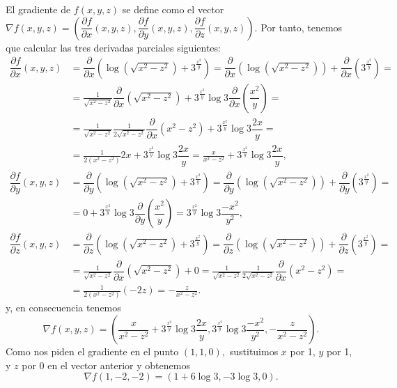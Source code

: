 {El gradiente de $f(x,y,z)$ se define como el vector $\nabla f(x,y,z)=(\dfrac{\partial f}{\partial x}(x,y,z),\dfrac{\partial f}{\partial y}(x,y,z),\dfrac{\partial f}{\partial z}(x,y,z))$. Por tanto, tenemos que calcular las tres derivadas parciales siguientes: 
\begin{align*}
\dfrac{\partial f}{\partial x}(x,y,z) &= \dfrac{\partial }{\partial x}(\log\left(\sqrt{x^{2}-z^{2}}\right) +3^{\tfrac{x^{2}}{y}}) = \dfrac{\partial }{\partial x}(\log \left(\sqrt{x^{2}-z^{2}}\right) )+\dfrac{\partial }{\partial x}(3^{\tfrac{x^{2}}{y}})= \\
&= \frac{1}{\sqrt{x^{2}-z^{2}}}\dfrac{\partial }{\partial x}(\sqrt{x^{2}-z^{2}})+3^{\tfrac{x^{2}}{y}}\log 3\dfrac{\partial }{\partial x}(\dfrac{x^{2}}{y}) = \\
&= \frac{1}{\sqrt{x^{2}-z^{2}}}\frac{1}{2\sqrt{x^{2}-z^{2}}}\dfrac{\partial}{\partial x}(x^{2}-z^{2})+3^{\tfrac{x^{2}}{y}}\log 3\dfrac{2x}{y}= \\
&= \frac{1}{2(x^{2}-z^{2})}2x+3^{\tfrac{x^{2}}{y}}\log 3\dfrac{2x}{y}=\frac{x}{x^{2}-z^{2}}+3^{\tfrac{x^{2}}{y}}\log 3\dfrac{2x}{y}, \\
\dfrac{\partial f}{\partial y}(x,y,z) &= \dfrac{\partial }{\partial y}(\log\left( \sqrt{x^{2}-z^{2}}\right) +3^{\tfrac{x^{2}}{y}}) = \dfrac{\partial }{\partial y}(\log \left( \sqrt{x^{2}-z^{2}}\right) )+\dfrac{\partial }{\partial y}(3^{\tfrac{x^{2}}{y}})= \\
&= 0+3^{\tfrac{x^{2}}{y}}\log 3\dfrac{\partial }{\partial y}(\dfrac{x^{2}}{y}) = 3^{\tfrac{x^{2}}{y}}\log 3\dfrac{-x^{2}}{y^{2}}, \\
\dfrac{\partial f}{\partial z}(x,y,z) &= \dfrac{\partial }{\partial z}(\log\left( \sqrt{x^{2}-z^{2}}\right) +3^{\tfrac{x^{2}}{y}}) = \dfrac{\partial }{\partial z}(\log \left( \sqrt{x^{2}-z^{2}}\right) )+\dfrac{\partial }{\partial z}(3^{\tfrac{x^{2}}{y}})= \\
&= \frac{1}{\sqrt{x^{2}-z^{2}}}\dfrac{\partial }{\partial x}(\sqrt{x^{2}-z^{2}})+0 = \frac{1}{\sqrt{x^{2}-z^{2}}}\frac{1}{2\sqrt{x^{2}-z^{2}}}\dfrac{\partial }{\partial x}(x^{2}-z^{2})= \\
&= \frac{1}{2(x^{2}-z^{2})}(-2z)=-\frac{z}{x^{2}-z^{2}}.
\end{align*}
y, en consecuencia tenemos 
\[
\nabla f(x,y,z)=(\frac{x}{x^{2}-z^{2}}+3^{\tfrac{x^{2}}{y}}\log 3\dfrac{2x}{y},3^{\tfrac{x^{2}}{y}}\log 3\dfrac{-x^{2}}{y^{2}},-\frac{z}{x^{2}-z^{2}}).
\]
Como nos piden el gradiente en el punto $(1,1,0),$ sustituimos $x$ por 1, $y$
por 1, y $z$ por 0 en el vector anterior y obtenemos 
\[
\nabla f(1,-2,-2)=(1+6\log 3,-3\log 3,0).
\]
}


